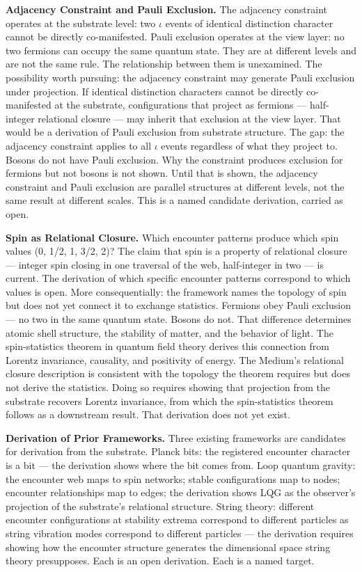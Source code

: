 \documentclass[11pt,letterpaper]{article}
\begin{document}
\textbf{Adjacency Constraint and Pauli Exclusion.} The adjacency constraint operates at the substrate level: two \(\iota\) events of identical distinction character cannot be directly co-manifested. Pauli exclusion operates at the view layer: no two fermions can occupy the same quantum state. They are at different levels and are not the same rule. The relationship between them is unexamined. The possibility worth pursuing: the adjacency constraint may generate Pauli exclusion under projection. If identical distinction characters cannot be directly co-manifested at the substrate, configurations that project as fermions --- half-integer relational closure --- may inherit that exclusion at the view layer. That would be a derivation of Pauli exclusion from substrate structure. The gap: the adjacency constraint applies to all \(\iota\) events regardless of what they project to. Bosons do not have Pauli exclusion. Why the constraint produces exclusion for fermions but not bosons is not shown. Until that is shown, the adjacency constraint and Pauli exclusion are parallel structures at different levels, not the same result at different scales. This is a named candidate derivation, carried as open.

\textbf{Spin as Relational Closure.} Which encounter patterns produce which spin values (0, 1/2, 1, 3/2, 2)? The claim that spin is a property of relational closure --- integer spin closing in one traversal of the web, half-integer in two --- is current. The derivation of which specific encounter patterns correspond to which values is open. More consequentially: the framework names the topology of spin but does not yet connect it to exchange statistics. Fermions obey Pauli exclusion --- no two in the same quantum state. Bosons do not. That difference determines atomic shell structure, the stability of matter, and the behavior of light. The spin-statistics theorem in quantum field theory derives this connection from Lorentz invariance, causality, and positivity of energy. The Medium's relational closure description is consistent with the topology the theorem requires but does not derive the statistics. Doing so requires showing that projection from the substrate recovers Lorentz invariance, from which the spin-statistics theorem follows as a downstream result. That derivation does not yet exist.

\textbf{Derivation of Prior Frameworks.} Three existing frameworks are candidates for derivation from the substrate. Planck bits: the registered encounter character is a bit --- the derivation shows where the bit comes from. Loop quantum gravity: the encounter web maps to spin networks; stable configurations map to nodes; encounter relationships map to edges; the derivation shows LQG as the observer's projection of the substrate's relational structure. String theory: different encounter configurations at stability extrema correspond to different particles as string vibration modes correspond to different particles --- the derivation requires showing how the encounter structure generates the dimensional space string theory presupposes. Each is an open derivation. Each is a named target.
\end{document}
